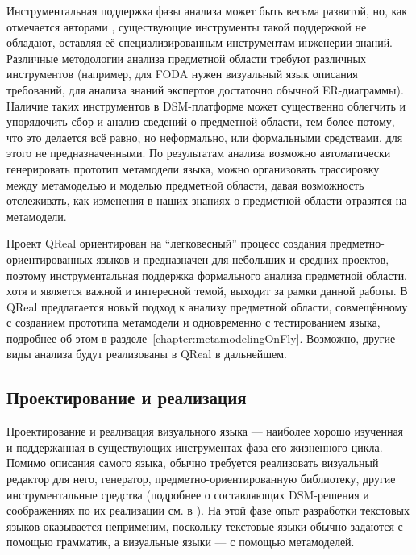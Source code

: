 Инструментальная поддержка фазы анализа может быть весьма развитой, но, как отмечается 
авторами \cite{mernik2005and}, существующие инструменты такой поддержкой не обладают, 
оставляя её специализированным инструментам инженерии знаний. Различные методологии 
анализа предметной области требуют различных инструментов (например, для FODA нужен 
визуальный язык описания требований, для анализа знаний экспертов достаточно обычной 
ER-диаграммы). Наличие таких инструментов в DSM-платформе может существенно облегчить 
и упорядочить сбор и анализ сведений о предметной области, тем более потому, что это 
делается всё равно, но неформально, или формальными средствами, для этого не предназначенными. 
По результатам анализа возможно автоматически генерировать прототип метамодели языка, 
можно организовать трассировку между метамоделью и моделью предметной области, давая 
возможность отслеживать, как изменения в наших знаниях о предметной области отразятся на метамодели.

Проект QReal ориентирован на "`легковесный"' процесс создания предметно-ориентированных 
языков и предназначен для небольших и средних проектов, поэтому инструментальная поддержка 
формального анализа предметной области, хотя и является важной и интересной темой, 
выходит за рамки данной работы. В QReal предлагается новый подход к анализу предметной 
области, совмещённому с созданием прототипа метамодели и одновременно с тестированием языка, 
подробнее об этом в разделе~\ref{chapter:metamodelingOnFly}. Возможно, другие виды анализа будут реализованы 
в QReal в дальнейшем.

\subsection{Проектирование и реализация}
Проектирование и реализация визуального языка --- наиболее хорошо изученная и поддержанная 
в существующих инструментах фаза его жизненного цикла. Помимо описания самого языка, 
обычно требуется реализовать визуальный редактор для него, генератор, предметно-ориентированную 
библиотеку, другие инструментальные средства (подробнее о составляющих DSM-решения и 
соображениях по их реализации см. в \cite{kelly2008domain}). На этой фазе опыт разработки 
текстовых языков оказывается неприменим, поскольку текстовые языки обычно задаются с 
помощью грамматик, а визуальные языки --- с помощью метамоделей.

